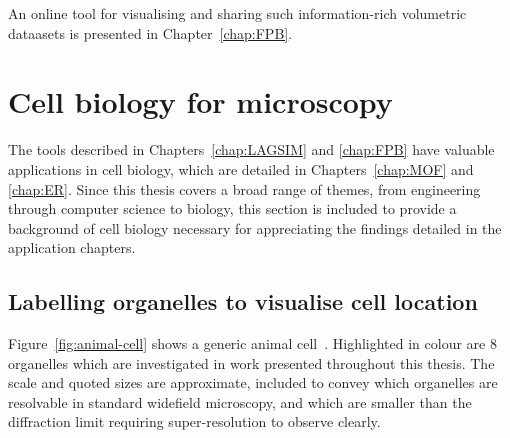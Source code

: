 An online tool for visualising and sharing such information-rich volumetric dataasets is presented in Chapter~\ref{chap:FPB}. 

\section{Cell biology for microscopy}
The tools described in Chapters~\ref{chap:LAGSIM} and \ref{chap:FPB} have valuable applications in cell biology, which are detailed in Chapters~\ref{chap:MOF} and \ref{chap:ER}.
Since this thesis covers a broad range of themes, from engineering through computer science to biology, this section is included to provide a background of cell biology necessary for appreciating the findings detailed in the application chapters. 

\subsection{Labelling organelles to visualise cell location}
Figure~\ref{fig:animal-cell} shows a generic animal cell~\cite{wikicell}. 
Highlighted in colour are 8 organelles which are investigated in work presented throughout this thesis. 
The scale and quoted sizes are approximate, included to convey which organelles are resolvable in standard widefield microscopy, and which are smaller than the diffraction limit requiring super-resolution to observe clearly. 

